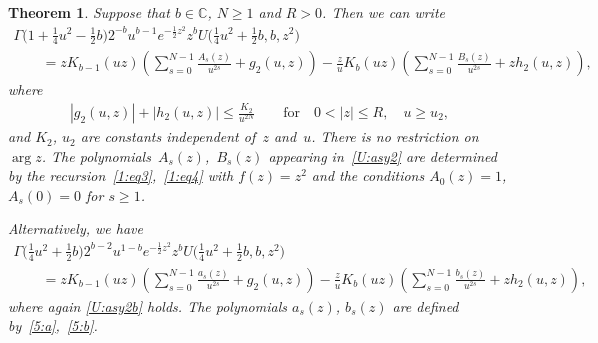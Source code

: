 \documentclass[pdftex]{sigma}
\newcommand{\C}{\mathbb{C}}
\numberwithin{equation}{section}
\newtheorem{Theorem}{Theorem}[section]
\begin{document}
\begin{Theorem}\label{U:t1}
Suppose that $b\in\C$, $N\ge 1$ and $R>0$. Then we can write
\begin{gather}
 \Gamma\big(1+\tfrac14u^2-\tfrac12 b\big)2^{-b}u^{b-1}e^{-\frac12z^2}z^b U\big(\tfrac14u^2+\tfrac12 b,b,z^2\big)\nonumber \\
\qquad {} = zK_{b-1}(uz)\left(\sum_{s=0}^{N-1} \frac{A_s(z)}{u^{2s}}+g_2(u,z)\right)
 -\frac{z}{u}K_b(uz)\left(\sum_{s=0}^{N-1} \frac{B_s(z)}{u^{2s}}+zh_2(u,z)\right),\label{U:asy2}
\end{gather}
where
\begin{gather}\label{U:asy2b}
|g_2(u,z)|+|h_2(u,z)|\le \frac{K_2}{u^{2N}}\qquad\text{for} \quad 0<|z|\le R, \quad u\ge u_2,
\end{gather}
and $K_2$, $u_2$ are constants independent of~$z$ and~$u$. There is no restriction on $\arg z$. The polyno\-mials~$A_s(z)$,~$B_s(z)$ appearing in~\eqref{U:asy2}
are determined by the recursion~\eqref{1:eq3},~\eqref{1:eq4} with $f(z)=z^2$ and the conditions $A_0(z)=1$, $A_s(0)=0$ for $s\ge 1$.

Alternatively, we have
\begin{gather}
 \Gamma\big(\tfrac14u^2+\tfrac12 b\big)2^{b-2}u^{1-b}e^{-\frac12z^2}z^b U\big(\tfrac14u^2+\tfrac12 b,b,z^2\big)\nonumber \\
\qquad{} = zK_{b-1}(uz)\left(\sum_{s=0}^{N-1} \frac{a_s(z)}{u^{2s}}+g_2(u,z)\right)
-\frac{z}{u}K_b(uz)\left(\sum_{s=0}^{N-1} \frac{b_s(z)}{u^{2s}}+zh_2(u,z)\right),\label{U:asy3}
\end{gather}
where again \eqref{U:asy2b} holds. The polynomials $a_s(z)$, $b_s(z)$ are defined by~\eqref{5:a},~\eqref{5:b}.
\end{Theorem}
\end{document}
